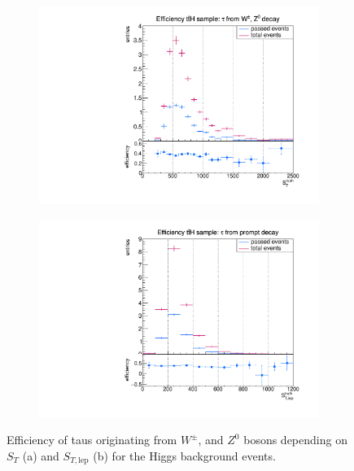 %
%
\begin{figure}
  \centering
                \begin{subfigure}[t]{0.49\textwidth}
                \includegraphics[width=\textwidth]{figures/plots/ttH/Divided_promptST.pdf}
                \label{Divided:prompt:ST}
                \end{subfigure}
                \begin{subfigure}[t]{0.49\textwidth}
                \includegraphics[width=\textwidth]{figures/plots/ttH/Divided_promptSTlep.pdf}
                \label{Divided:prompt:STlep}
\end{subfigure}
\caption[Efficiency of taus originating from $W^\pm$, and $Z^0$ bosons for the Higgs background events.]{Efficiency of taus originating from $W^\pm$, and $Z^0$ bosons depending on $S_{T}$ (a) and $S_{T,\text{lep}}$ (b) for the Higgs background events.}
\label{Divided:prompt:STgedöns}
\end{figure}
